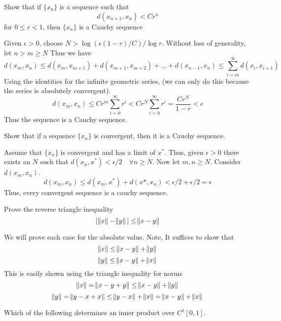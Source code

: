 \documentclass{homework}
\begin{document}
\begin{problem}[2-20]
  Show that if $\{x_n\}$ is a sequence such that 
  \[ d(x_{n+1}, x_n) < Cr^n\]
  for $0 \leq r < 1$, then $\{x_n\}$ is a Cauchy sequence
\end{problem}

\begin{solution}
  Given $\epsilon > 0$, choose $N > \log{(\epsilon(1-r)/C)}/\log{r}$. Without loss of generality, let $n > m \geq N$ Thus we have
  \[d(x_m, x_n) \leq d(x_m, x_{m+1}) + d(x_{m+1}, x_{m+2}) + \dots + d(x_{n-1}, x_{n}) \leq \sum_{i = m}^{\infty} d(x_{i}, x_{i+1})\]
  Using the identities for the infinite geometric series, (we can only do this because the series is absolutely convergent).
  \[d(x_m, x_n) \leq Cr^m\sum_{i=0}^{\infty} r^i < Cr^N\sum_{i=0}^{\infty} r^i = \frac{Cr^N}{1 - r} < \epsilon \]
  Thus the sequence is a Cauchy sequence.
\end{solution}

\begin{problem}[2-22]
  Show that if a sequence $\{x_n\}$ is convergent, then it is a Cauchy sequence.
\end{problem}

\begin{solution}
  Assume that $\{x_n\}$ is convergent and has a limit of $x^*$. Thus, given $\epsilon > 0$ there exists an $N$ such that $d(x_n, x^*) < \epsilon/2 \quad \forall n \geq N$. Now let $m,n \geq N$. Consider $d(x_m, x_n)$.
  \[d(x_m, x_n) \leq d(x_m, x^*) + d(x*,x_n) < \epsilon/2 + \epsilon/2 = \epsilon\]
Thus, every convergent sequence is a cauchy sequence.
\end{solution}

\begin{problem}[2-33]
  Prove the reverse triangle inequality
  \[|\norm{x} - \norm{y}| \leq \norm{x-y}\]
\end{problem}

\begin{solution}
  We will prove each case for the absolute value. Note, It suffices to show that 
  \[\norm{x} \leq \norm{x - y} + \norm{y}\]
  \[\norm{y} \leq \norm{x - y} + \norm{x}\]
  This is easily shown using the triangle inequality for norms
  \[\norm{x} = \norm{x - y + y} \leq \norm{x - y} + \norm{y}\]
  \[\norm{y} = \norm{y - x + x} \leq \norm{y - x} + \norm{x} = \norm{x - y} + \norm{x}\]
\end{solution}

\begin{problem}[2-42]
  Which of the following determines an inner product over $C^1[0,1]$.
  \begin{parts}
    \part
    \[\langle f, g \rangle = \int_0^1 f'(t)g'(t)\ dt + f(0)g(0)\]
    \part
    \[\langle f, g \rangle = \int_0^1 f'(t)g'(t)\ dt\]
  \end{parts}
\end{problem}
\end{document}
